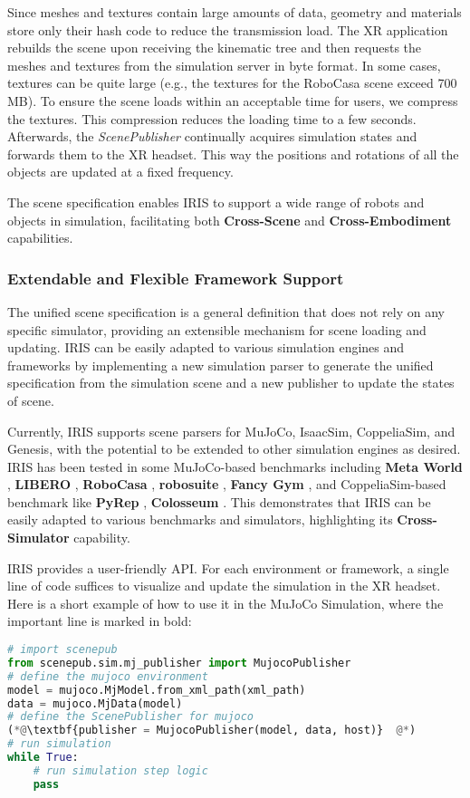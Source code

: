 Since meshes and textures contain large amounts of data, 
geometry and materials store only their hash code to reduce the transmission load. 
The XR application rebuilds the scene upon receiving the kinematic tree and then requests the meshes and textures from the simulation server in byte format.
In some cases, textures can be quite large (e.g., the textures for the RoboCasa \cite{nasiriany2024robocasa} scene exceed 700 MB). To ensure the scene loads within an acceptable time for users, we compress the textures. This compression reduces the loading time to a few seconds.
Afterwards, the \textit{ScenePublisher} continually acquires simulation states and forwards them to the XR headset. This way the positions and rotations of all the objects are updated at a fixed frequency.

The scene specification enables IRIS to support a wide range of robots and objects in simulation, facilitating both \textbf{Cross-Scene} and \textbf{Cross-Embodiment} capabilities.


\subsubsection{Extendable and Flexible Framework Support}
The unified scene specification is a general definition that does not rely on any specific simulator, providing an extensible mechanism for scene loading and updating. IRIS can be easily adapted to various simulation engines and frameworks by implementing a new simulation parser to generate the unified specification from the simulation scene and a new publisher to update the states of scene.

Currently, IRIS supports scene parsers for MuJoCo, IsaacSim, CoppeliaSim, and Genesis, with the potential to be extended to other simulation engines as desired.
IRIS has been tested in some MuJoCo-based benchmarks including \textbf{Meta World} \cite{yu2020meta}, \textbf{LIBERO} \cite{liu2024libero}, \textbf{RoboCasa} \cite{nasiriany2024robocasa}, \textbf{robosuite} \cite{zhu2020robosuite}, \textbf{Fancy Gym} \cite{fancy_gym}, and CoppeliaSim-based benchmark like 
\textbf{PyRep} \cite{james2019pyrep},
\textbf{Colosseum} \cite{pumacay2024colosseum}.
This demonstrates that IRIS can be easily adapted to various benchmarks and simulators, highlighting its \textbf{Cross-Simulator} capability.


IRIS provides a user-friendly API.
For each environment or framework,
a single line of code suffices to visualize and update the simulation in the XR headset.
Here is a short example of how to use it in the MuJoCo Simulation, where the important line is marked in bold: 
\begin{lstlisting}[language=Python]
# import scenepub
from scenepub.sim.mj_publisher import MujocoPublisher
# define the mujoco environment
model = mujoco.MjModel.from_xml_path(xml_path)
data = mujoco.MjData(model)
# define the ScenePublisher for mujoco
(*@\textbf{publisher = MujocoPublisher(model, data, host)}  @*)
# run simulation
while True:
    # run simulation step logic
    pass
\end{lstlisting}

